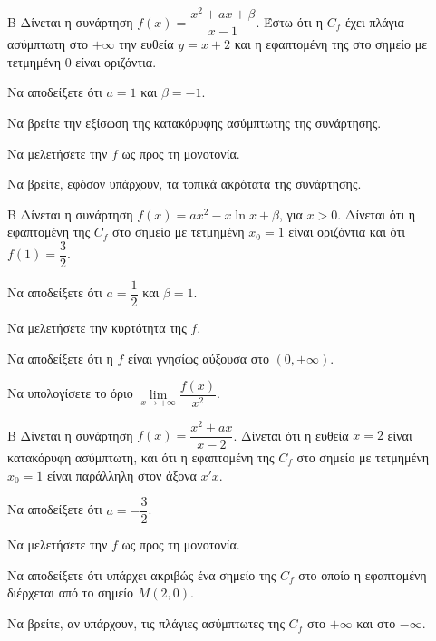 \begin{thema}{Β}
Δίνεται η συνάρτηση $f(x) = \dfrac{x^2+ax+\beta}{x-1}$. Έστω ότι η $C_f$ έχει πλάγια ασύμπτωτη στο $+\infty$ την ευθεία $y = x+2$ και η εφαπτομένη της στο σημείο με τετμημένη $0$ είναι οριζόντια.
\begin{erwthma}
  \item Να αποδείξετε ότι $a=1$ και $\beta=-1$.
  \item Να βρείτε την εξίσωση της κατακόρυφης ασύμπτωτης της συνάρτησης.
  \item Να μελετήσετε την $f$ ως προς τη μονοτονία.
  \item Να βρείτε, εφόσον υπάρχουν, τα τοπικά ακρότατα της συνάρτησης.
\end{erwthma}
\end{thema}

\begin{thema}{Β}
Δίνεται η συνάρτηση $f(x) = a x^2 - x \ln x + \beta$, για $x>0$. Δίνεται ότι η εφαπτομένη της $C_f$ στο σημείο με τετμημένη $x_0=1$ είναι οριζόντια και ότι $f(1)=\dfrac{3}{2}$.
\begin{erwthma}
  \item Να αποδείξετε ότι $a=\dfrac{1}{2}$ και $\beta=1$.
  \item Να μελετήσετε την κυρτότητα της $f$.
  \item Να αποδείξετε ότι η $f$ είναι γνησίως αύξουσα στο $(0,+\infty)$.
  \item Να υπολογίσετε το όριο $\lim\limits_{x \to +\infty} \dfrac{f(x)}{x^2}$.
\end{erwthma}
\end{thema}

\begin{thema}{Β}
Δίνεται η συνάρτηση $f(x) = \dfrac{x^2+a x}{x-2}$. Δίνεται ότι η ευθεία $x=2$ είναι κατακόρυφη ασύμπτωτη, και ότι η εφαπτομένη της $C_f$ στο σημείο με τετμημένη $x_0=1$ είναι παράλληλη στον άξονα $x'x$.
\begin{erwthma}
  \item Να αποδείξετε ότι $a=-\dfrac{3}{2}$.
  \item Να μελετήσετε την $f$ ως προς τη μονοτονία.
  \item Να αποδείξετε ότι υπάρχει ακριβώς ένα σημείο της $C_f$ στο οποίο η εφαπτομένη διέρχεται από το σημείο $M(2, 0)$.
  \item Να βρείτε, αν υπάρχουν, τις πλάγιες ασύμπτωτες της $C_f$ στο $+\infty$ και στο $-\infty$.
\end{erwthma}
\end{thema}

